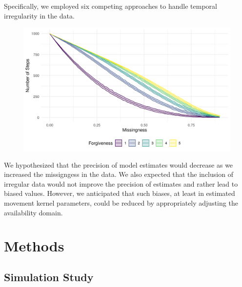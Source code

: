 \documentclass[abstract=on,10pt,a4paper,bibliography=totocnumbered]{article}
\begin{document}
Specifically, we employed six competing approaches to handle temporal
irregularity in the data.

\begin{figure}
  \begin{center}
  \includegraphics[width = \textwidth]{99_NumberOfSteps.png}
  \caption{}
  \label{Covariates}
  \end{center}
\end{figure}

We hypothesized that the precision of model estimates would decrease as we
increased the missigngess in the data. We also expected that the inclusion of
irregular data would not improve the precision of estimates and rather lead to
biased values. However, we anticipated that such biases, at least in estimated
movement kernel parameters, could be reduced by appropriately adjusting the
availability domain.

\section{Methods}
\subsection{Simulation Study}
\end{document}
